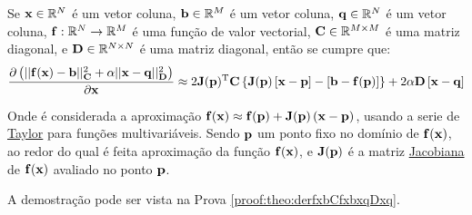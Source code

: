 \begin{theorem}\label{theo:derfxbCfxbxqDxq}
Se 
$\VECTOR{x}\in \mathbb{R}^N$ é um vetor coluna, 
$\VECTOR{b}\in \mathbb{R}^M$ é um vetor coluna,
$\VECTOR{q}\in \mathbb{R}^N$ é um vetor coluna, 
$\VECTOR{f}: \mathbb{R}^{N}\rightarrow \mathbb{R}^{M}$ é uma função de valor vectorial, 
$\MATRIX{C} \in \mathbb{R}^{M\times M}$ é uma matriz diagonal, e
$\MATRIX{D} \in \mathbb{R}^{N\times N}$ é uma matriz diagonal, 
então se cumpre que:
\begin{equation}
\frac{\partial \left(||\VECTOR{f}(\VECTOR{x})-\VECTOR{b}||_{\MATRIX{C}}^2+\alpha||\VECTOR{x}-\VECTOR{q}||_{\MATRIX{D}}^2\right)}{\partial \VECTOR{x}} \approx
2 \MATRIX{J}(\VECTOR{p})^{\transpose}\MATRIX{C}\left\{\MATRIX{J}(\VECTOR{p})\left[\VECTOR{x} - \VECTOR{p}\right]-\left[\VECTOR{b}-\VECTOR{f}(\VECTOR{p})\right] \right\}
+2\alpha\MATRIX{D}\left[\VECTOR{x}-\VECTOR{q}\right]
\end{equation}

Onde é considerada a aproximação
$\VECTOR{f}(\VECTOR{x})\approx \VECTOR{f}(\VECTOR{p})+\MATRIX{J}(\VECTOR{p})\left(\VECTOR{x}-\VECTOR{p}\right)$,
usando a serie de \hyperref[def:taylor]{Taylor} \cite{Taylor} para funções multivariáveis. Sendo $\VECTOR{p}$ um ponto fixo no domínio de $\VECTOR{f}(\VECTOR{x})$,  ao redor do qual é feita  aproximação
da função $\VECTOR{f}(\VECTOR{x})$,
e $\MATRIX{J}(\VECTOR{p})$ é a matriz \hyperref[def:jacobian]{Jacobiana} \cite{Jacobian} de $\VECTOR{f}(\VECTOR{x})$ avaliado no ponto $\VECTOR{p}$.

A demostração pode ser vista na Prova \ref{proof:theo:derfxbCfxbxqDxq}.
\end{theorem}

